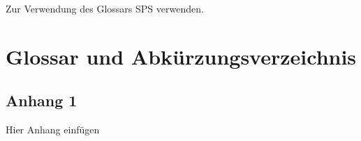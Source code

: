 \documentclass[12pt]{extarticle}
\renewcommand*{\listoffigures}{%
  \begingroup
  \tocchapter
  \tocfile{\listfigurename}{lof}
  \endgroup
  
  
}
\begin{document}







\newpage
\begin{spacing}{1.0}
\tableofcontents %
\newpage
\end{spacing}

\begin{spacing}{1.0}
  
  \newpage
  \end{spacing}

\listoffigures
\newpage


\newpage


\pagestyle{fancy}
\fancyhf{}
\renewcommand{\headrulewidth}{0pt} %
\renewcommand{\sectionmark}[1]{\markright{\arabic{section}.\ #1}}

\renewcommand{\footrulewidth}{0.4pt}%
\fancyfoot[LO, RE]{\thepage}%







Zur Verwendung des Glossars \gls{SPS} verwenden.

\clearpage
\newpage

 {}
\renewcommand \refname{Glossar} \section*{Glossar und Abkürzungsverzeichnis}
\renewcommand{\glossarysection}[2][]{}
\printglossary[type=main,nonumberlist]


\newpage
\printbibliography
% 
% 

\begin{appendix}

\section{Anhang 1}
Hier Anhang einfügen

\end{appendix}
\end{document}

